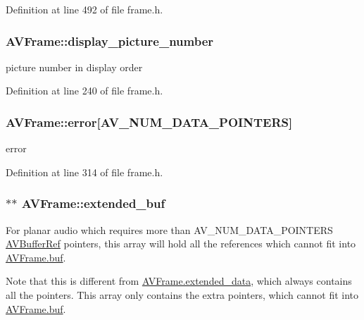 Definition at line 492 of file frame.\+h.

\subsubsection[{\texorpdfstring{display\+\_\+picture\+\_\+number}{display_picture_number}}]{ A\+V\+Frame\+::display\+\_\+picture\+\_\+number}\hypertarget{struct_a_v_frame_a12b00a552b74c79f0760b80fac18efe7}{}\label{struct_a_v_frame_a12b00a552b74c79f0760b80fac18efe7}
picture number in display order 

Definition at line 240 of file frame.\+h.

\subsubsection[{\texorpdfstring{error}{error}}]{ A\+V\+Frame\+::error\mbox{[}{\bf A\+V\+\_\+\+N\+U\+M\+\_\+\+D\+A\+T\+A\+\_\+\+P\+O\+I\+N\+T\+E\+RS}\mbox{]}}\hypertarget{struct_a_v_frame_a3893c612b55b82258333f99a32117e60}{}\label{struct_a_v_frame_a3893c612b55b82258333f99a32117e60}
error 

Definition at line 314 of file frame.\+h.

\subsubsection[{\texorpdfstring{extended\+\_\+buf}{extended_buf}}]{$\ast$$\ast$ A\+V\+Frame\+::extended\+\_\+buf}\hypertarget{struct_a_v_frame_a254a144d113ceedc003ec1547cc5bd54}{}\label{struct_a_v_frame_a254a144d113ceedc003ec1547cc5bd54}
For planar audio which requires more than A\+V\+\_\+\+N\+U\+M\+\_\+\+D\+A\+T\+A\+\_\+\+P\+O\+I\+N\+T\+E\+RS \hyperlink{struct_a_v_buffer_ref}{A\+V\+Buffer\+Ref} pointers, this array will hold all the references which cannot fit into \hyperlink{struct_a_v_frame_a4a64d05cc676bfa8e18bf22d16c8a51f}{A\+V\+Frame.\+buf}.

Note that this is different from \hyperlink{struct_a_v_frame_afca04d808393822625e09b5ba91c6756}{A\+V\+Frame.\+extended\+\_\+data}, which always contains all the pointers. This array only contains the extra pointers, which cannot fit into \hyperlink{struct_a_v_frame_a4a64d05cc676bfa8e18bf22d16c8a51f}{A\+V\+Frame.\+buf}.

